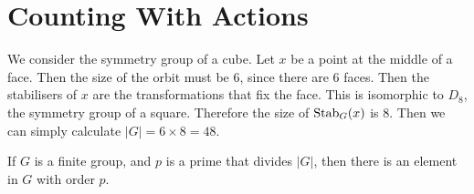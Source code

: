 \documentclass[../Main.tex]{subfiles}
\begin{document}
\section{Counting With Actions}
\begin{example}
    We consider the symmetry group of a cube. Let $x$ be a point at the middle of a face. Then the size of the orbit must be 6, since there are 6 faces. Then the stabilisers of $x$ are the transformations that fix the face. This is isomorphic to $D_8$, the symmetry group of a square. Therefore the size of $\operatorname{Stab}_G(x)$ is 8. Then we can simply calculate $|G| = 6 \times 8 = 48$.
\end{example}
\begin{theorem}
    If $G$ is a finite group, and $p$ is a prime that divides $|G|$, then there is an element in $G$ with order $p$.
    \label{thmCauchy}
\end{theorem}
\end{document}
